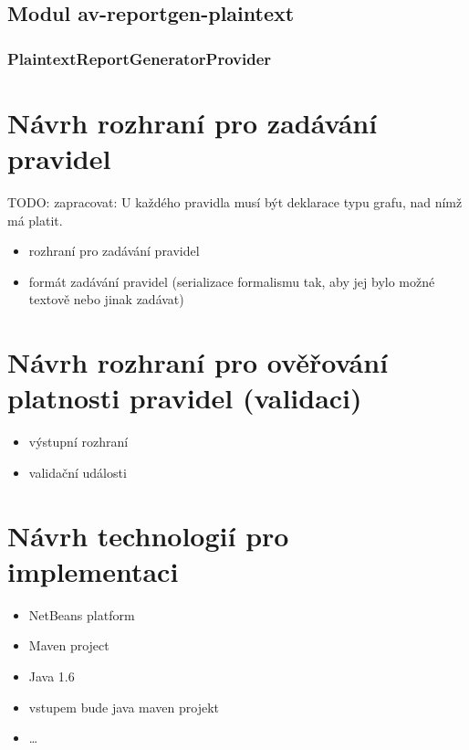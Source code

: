 \subsection{Modul av-reportgen-plaintext}
\subsubsection{PlaintextReportGeneratorProvider}



\section{Návrh rozhraní pro zadávání pravidel}
TODO: zapracovat: U každého pravidla musí být deklarace typu grafu, nad nímž má platit.
\begin{itemize}
\item rozhraní pro zadávání pravidel
\item formát zadávání pravidel (serializace formalismu tak, aby jej bylo možné textově nebo jinak zadávat)
\end{itemize}

\section{Návrh rozhraní pro ověřování platnosti pravidel (validaci)}
\begin{itemize}
\item výstupní rozhraní
\item validační události
\end{itemize}

%
%

\section{Návrh technologií pro implementaci}
\begin{itemize}
\item NetBeans platform
\item Maven project
\item Java 1.6
\item vstupem bude java maven projekt
\item \ldots
\end{itemize}
